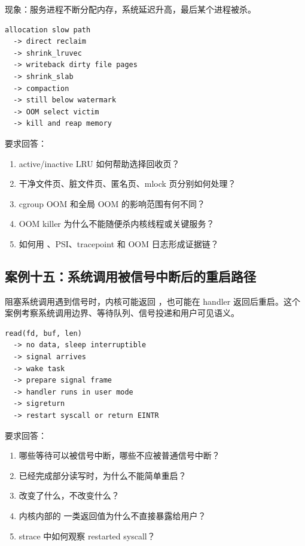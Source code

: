 现象：服务进程不断分配内存，系统延迟升高，最后某个进程被杀。

\begin{lstlisting}
allocation slow path
  -> direct reclaim
  -> shrink_lruvec
  -> writeback dirty file pages
  -> shrink_slab
  -> compaction
  -> still below watermark
  -> OOM select victim
  -> kill and reap memory
\end{lstlisting}

要求回答：

\begin{enumerate}
\tightlist
\item active/inactive LRU 如何帮助选择回收页？
\item 干净文件页、脏文件页、匿名页、mlock 页分别如何处理？
\item cgroup OOM 和全局 OOM 的影响范围有何不同？
\item OOM killer 为什么不能随便杀内核线程或关键服务？
\item 如何用 、PSI、tracepoint 和 OOM 日志形成证据链？
\end{enumerate}

\subsection{案例十五：系统调用被信号中断后的重启路径}

阻塞系统调用遇到信号时，内核可能返回 ，也可能在 handler 返回后重启。这个案例考察系统调用边界、等待队列、信号投递和用户可见语义。

\begin{lstlisting}
read(fd, buf, len)
  -> no data, sleep interruptible
  -> signal arrives
  -> wake task
  -> prepare signal frame
  -> handler runs in user mode
  -> sigreturn
  -> restart syscall or return EINTR
\end{lstlisting}

要求回答：

\begin{enumerate}
\tightlist
\item 哪些等待可以被信号中断，哪些不应被普通信号中断？
\item 已经完成部分读写时，为什么不能简单重启？
\item {} 改变了什么，不改变什么？
\item 内核内部的  一类返回值为什么不直接暴露给用户？
\item strace 中如何观察 restarted syscall？
\end{enumerate}
